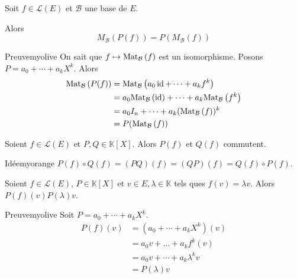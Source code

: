     \begin{prop}{}{}
        Soit $f \in \mathcal{L}(E)$ et $\mathcal{B}$ une base de $E$.

        Alors \[ M_{\mathcal{B}}(P(f)) = P(M_{\mathcal{B}}(f)) \]
    \end{prop}

    \begin{demo}{Preuve}{myolive}
        On sait que $f \mapsto \text{Mat}_{\mathcal{B}}\left(f\right)$ est un isomorphisme. Posons $P = a_0 + \cdots + a_k X^k$. Alors 
        \begin{align*}
            \text{Mat}_{\mathcal{B}}\left(P(f)\right) 
            &= \text{Mat}_{\mathcal{B}}\left(a_0 \operatorname{id} + \cdots + a_k f^k\right) \\
            &= a_0 \text{Mat}_{\mathcal{B}}\left(\operatorname{id}\right) + \cdots + a_k \text{Mat}_{\mathcal{B}}\left(f^k\right) \\
            &= a_0 I_n + \cdots + a_k (\text{Mat}_{\mathcal{B}}\left(f\right))^k \\
            &= P(\text{Mat}_{\mathcal{B}}\left(f\right))
        \end{align*}
    \end{demo}

    \begin{coro}{}{}
        Soient $f \in \mathcal{L}(E)$ et $P,Q \in \mathbb{K}[X]$. Alors $P(f)$ et $Q(f)$ commutent.
    \end{coro}

    \begin{demo}{Idée}{myorange}
        $P(f) \circ Q(f) = (PQ)(f) = (QP)(f) = Q(f) \circ P(f)$.
    \end{demo}

    \begin{prop}{}{}
        Soient $f \in \mathcal{L}(E)$, $P \in \mathbb{K}[X]$ et $v \in E, \lambda \in \mathbb{K}$ tels ques $f(v) = \lambda v$. Alors $P(f)(v) P(\lambda)v$.
    \end{prop}

    \begin{demo}{Preuve}{myolive}
        Soit $P = a_0 + \cdots + a_k X^k$. 
        \begin{align*}
            P(f)(v) 
            &= \left(a_0 + \cdots + a_k X^k\right)(v) \\
            &= a_0 v + \ldots + a_k f^k(v) \\
            &= a_0 v + \cdots + a_k \lambda^k v \\
            &= P(\lambda)v
        \end{align*}
    \end{demo}

